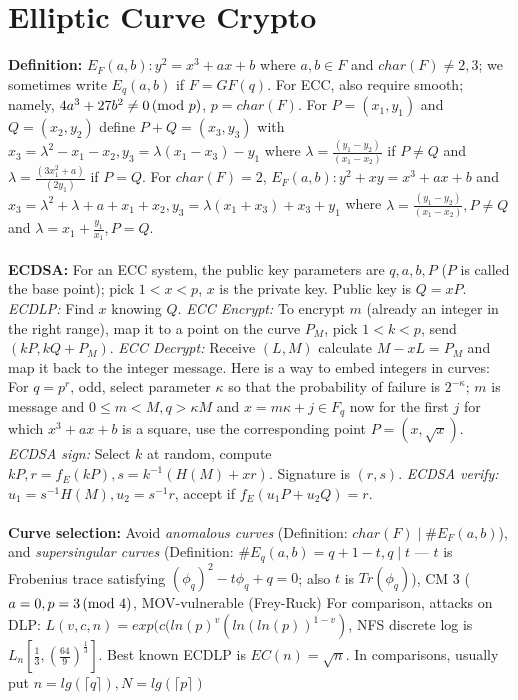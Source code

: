 \section{Elliptic Curve Crypto}
{\bf Definition:}
$E_F(a,b): y^2= x^3 + ax +b$ where $a,b \in F$ and $char(F) \ne 2,3$;  we sometimes
write $E_q(a,b)$ if $F=GF(q)$.  For ECC, also
require smooth; namely, $4a^3 + 27b^2 \ne 0 \thinspace \textnormal{(mod } p \textnormal{)}$, $p= char(F)$.  For
$P=(x_1, y_1)$ and $Q=(x_2, y_2)$ define $P+Q=(x_3, y_3)$ with
$x_3 = \lambda^2 - x_1 - x_2, y_3= \lambda(x_1-x_3)-y_1$ where
$\lambda= {\frac {(y_1-y_2)} {(x_1-x_2)}}$ if $P \ne Q$ and
$\lambda= {\frac {(3 x_1^2 + a)} {(2 y_1)}}$ if $P = Q$.  For $char(F)=2$,
$E_F(a,b): y^2 + xy = x^3 + ax +b$ and $x_3= \lambda^2+\lambda+a+x_1+x_2, 
y_3= \lambda(x_1+x_3)+x_3+y_1$ where 
$\lambda= {\frac {(y_1 - y_2)} {(x_1-x_2)}}, P \ne Q$ and
$\lambda= x_1 + {\frac {y_1} {x_1}}, P = Q$.
\\
\\
{\bf ECDSA:}
For an ECC system,
the public key parameters are $q, a, b, P$ ($P$ is called the base point);
pick $1 <x < p$, $x$ is the private key.  Public key is $Q=xP$.  
\emph{ECDLP:} Find $x$ knowing $Q$.
\emph{ECC Encrypt:}  To encrypt $m$ (already an integer in the right range), map it
to a point on the curve $P_M$, pick $1<k<p$,
send $(kP, kQ+P_M)$.  
\emph{ECC Decrypt:} Receive $(L,M)$ calculate $M-xL=P_M$ and map it
back to the integer message.  Here is a way to embed
integers in curves: For $q=p^r$, odd, select parameter $\kappa$ so that the
probability of failure is $2^{- \kappa}$; $m$ is message and $0 \le m <M, q>\kappa M$ and
$x=m \kappa +j \in F_q$ now for the first $j$ for which $x^3+ax+b$ is a square, use 
the corresponding point $P=(x,{\sqrt x})$.
\emph{ECDSA sign:}  Select $k$ at random, compute $kP, r=f_E(kP), s= k^{-1} (H(M)+xr)$.
Signature
is $(r,s)$.  \emph{ECDSA verify:} $u_1=s^{-1}H(M), u_2= s^{-1}r$, accept if $f_E(u_1P+u_2Q)=r$.
\\
\\
{\bf Curve selection:}  Avoid \emph{anomalous curves}
(Definition: $char(F) \mid \#E_F(a,b)$), and
\emph{supersingular curves} (Definition: $\#E_q(a,b)= q+1-t, q \mid t$ ---
$t$ is Frobenius trace satisfying $(\phi_q)^2-t \phi_q +q=0$; also
$t$ is $Tr(\phi_q)$),
CM 3 ($a=0, p=3 \thinspace \textnormal{(mod } 4 \textnormal{)}$, MOV-vulnerable (Frey-Ruck)
For comparison, attacks on DLP: 
$L(v,c,n)=exp(c(ln(p)^v (ln(ln(p))^{1-v})$, 
NFS discrete log is $L_n[{\frac 1 3}, ({\frac {64} 9})^{\frac 1 3}]$.
Best known ECDLP is
$EC(n)= {\sqrt n}$. In comparisons, usually put 
$n= lg(\lceil q \rceil), N= lg(\lceil p \rceil)$
